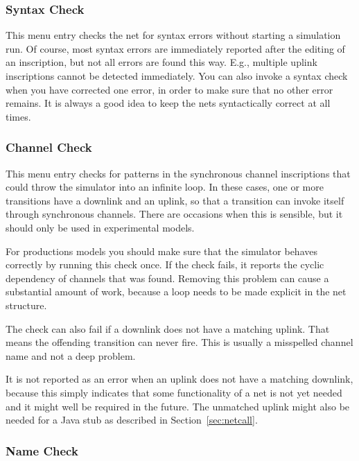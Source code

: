 \subsubsection{Syntax Check}

This menu entry checks the net for syntax errors without
starting a simulation run. Of course, most syntax errors are
immediately reported after the editing of an inscription,
but not all errors are found this way. E.g., multiple uplink
inscriptions cannot be detected immediately. You can also
invoke a syntax check when you have corrected one error,
in order to make sure that no other error remains. It is
always a good idea to keep the nets syntactically
correct at all times.

\iffalse
\subsubsection{Channel Check}

This menu entry checks for patterns in the synchronous channel
inscriptions that could throw the simulator into an infinite loop.
In these cases, one or more transitions have a downlink and an uplink,
so that a transition can invoke itself through synchronous channels.
There are occasions when this is sensible, but it should only be
used in experimental models.

For productions models you should
make sure that the simulator behaves correctly by running this
check once.
If the check fails, it reports the cyclic dependency of channels
that was found. Removing this problem can cause a substantial
amount of work, because a loop needs to be made explicit
in the net structure.

The check can also fail if a downlink does not have a matching
uplink. That means the offending transition can never fire.
This is usually a misspelled channel name and not a deep problem.

It is not reported as an error when an uplink does not have a matching
downlink, because this simply indicates that some functionality
of a net is not yet needed and it might well be required in the
future. The unmatched uplink might also be needed for a
Java stub as described in Section~\ref{sec:netcall}.


\subsubsection{Name Check}

